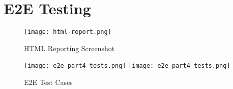\chapter{E2E Testing}
\label{appendix:e2e-testing}

\begin{figure}[!hbt]
  	\centering
 	\texttt{[image: html-report.png]}
  	\caption{HTML Reporting Screenshot}
 	\label{fig:html-reporting}
\end{figure}


\begin{figure}[!hbt]
  	\centering
 	\texttt{[image: e2e-part4-tests.png]}
 	\texttt{[image: e2e-part4-tests.png]}
  	\caption{E2E Test Cases}
 	\label{fig:e2e-test-cases}
\end{figure}
